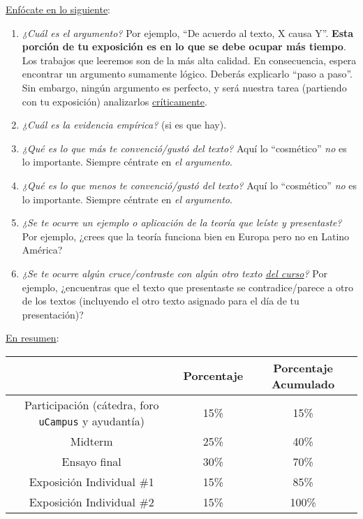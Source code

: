 \documentclass[letterpaper]{article}
\begin{document}
\begin{enumerate}
	\underline{Enf\'ocate en lo siguiente}:

		\begin{enumerate}
			\item \emph{¿Cu\'al es el argumento?} Por ejemplo, ``De acuerdo al texto, X causa Y''. {\bf Esta porci\'on de tu exposici\'on es en lo que se debe ocupar m\'as tiempo}. Los trabajos que leeremos son de la m\'as alta calidad. En consecuencia, espera encontrar un argumento sumamente l\'ogico. Deber\'as explicarlo ``paso a paso''. Sin embargo, ning\'un argumento es perfecto, y ser\'a nuestra tarea (partiendo con tu exposici\'on) analizarlos \underline{cr\'iticamente}. 
			\item \emph{¿Cu\'al es la evidencia emp\'irica?} (si es que hay).
			\item \emph{¿Qu\'e es lo que m\'as te convenci\'o/gust\'o del texto?} Aqu\'i lo ``cosm\'etico'' \emph{no} es lo importante. Siempre c\'entrate en \emph{el argumento}.
			\item \emph{¿Qu\'e es lo que menos te convenci\'o/gust\'o del texto?} Aqu\'i lo ``cosm\'etico'' \emph{no} es lo importante. Siempre c\'entrate en \emph{el argumento}.
			\item \emph{¿Se te ocurre un ejemplo o aplicaci\'on de la teor\'ia que le\'iste y presentaste?} Por ejemplo, ¿crees que la teor\'ia funciona bien en Europa pero no en Latino Am\'erica?
			\item \emph{¿Se te ocurre alg\'un cruce/contraste con alg\'un otro texto \underline{del curso}?} Por ejemplo, ¿encuentras que el texto que presentaste se contradice/parece a otro de los textos (incluyendo el otro texto asignado para el d\'ia de tu presentaci\'on)?
		\end{enumerate}


\end{enumerate}


\underline{En resumen}:

\begin{table}[h]
\centering
\begin{tabular}{ccc}
							& \textbf{Porcentaje} & {\bf Porcentaje Acumulado} \\
							\hline
Participaci\'on  (c\'atedra, foro \texttt{uCampus} y ayudant\'ia) & 15\%       & 15\%                 \\
\hline
Midterm 				& 25\% & 40\%                 \\
Ensayo final 		& 30\% & 70\%                 \\
\hline
Exposici\'on Individual \#1 	& 15\% & 85\%    \\
Exposici\'on Individual \#2 	& 15\% & 100\%    \\
\hline             
\end{tabular}
\end{table}
\end{document}
